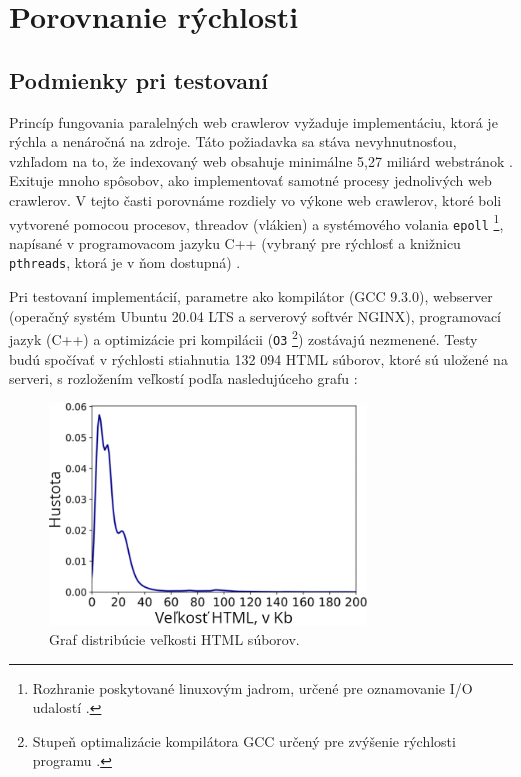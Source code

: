 \documentclass[10pt,twoside,slovak,a4paper]{article}
\begin{document}
\newpage

\section{Porovnanie rýchlosti}

\subsection{Podmienky pri testovaní}

Princíp fungovania paralelných web crawlerov vyžaduje implementáciu, ktorá je rýchla a nenáročná na zdroje. Táto požiadavka sa stáva nevyhnutnosťou, vzhľadom na to, že indexovaný web obsahuje minimálne 5,27 miliárd webstránok \cite{9648837}. Exituje mnoho spôsobov, ako implementovať samotné procesy jednolivých web crawlerov. V tejto časti porovnáme rozdiely vo výkone web crawlerov, ktoré boli vytvorené pomocou procesov, threadov (vlákien) a systémového volania \texttt{epoll} \footnote{Rozhranie poskytované linuxovým jadrom, určené pre oznamovanie I/O udalostí \cite{kerrisk2010linux}.}, napísané v programovacom jazyku C++ (vybraný pre rýchlosť a knižnicu \texttt{pthreads}, ktorá je v ňom dostupná) \cite{9648837}.

Pri testovaní implementácií, parametre ako kompilátor (GCC 9.3.0), webserver (operačný systém Ubuntu 20.04 LTS a serverový softvér NGINX), programovací jazyk (C++) a optimizácie pri kompilácii (\texttt{O3} \footnote{Stupeň optimalizácie kompilátora GCC určený pre zvýšenie rýchlosti programu \cite{stallman2009using}.}) zostávajú nezmenené. Testy budú spočívať v rýchlosti stiahnutia 132 094 HTML súborov, ktoré sú uložené na serveri, s rozložením veľkostí podľa nasledujúceho grafu \cite{9648837}:

\begin{figure}[hbt!]
    \centering
    \includegraphics[width=0.75\textwidth]{dataset.png}
    \caption{Graf distribúcie veľkosti HTML súborov. \cite{9648837}}
\end{figure}
\end{document}
